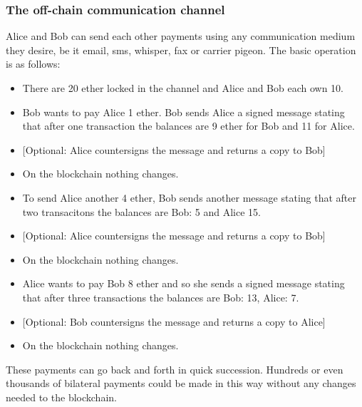 \subsubsection*{The off-chain communication channel}
Alice and Bob can send each other payments using any communication medium they desire, be it email, sms, whisper, fax or carrier pigeon. The basic operation is as follows: 
\begin{itemize}
 \item There are 20 ether locked in the channel and Alice and Bob each own 10.
 \item Bob wants to pay Alice 1 ether. Bob sends Alice a signed message stating that after one transaction the balances are 9 ether for Bob and 11 for Alice.
 \item {[}Optional: Alice countersigns the message and returns a copy to Bob]
 \item On the blockchain nothing changes.
 \item To send Alice another 4 ether, Bob sends another message stating that after two transacitons the balances are Bob: 5 and Alice 15.
 \item {[}Optional: Alice countersigns the message and returns a copy to Bob]
 \item On the blockchain nothing changes.
 \item Alice wants to pay Bob 8 ether and so she sends a signed message stating that after three transactions the balances are Bob: 13, Alice: 7.
 \item {[}Optional: Bob countersigns the message and returns a copy to Alice]
 \item On the blockchain nothing changes.
\end{itemize}
These payments can go back and forth in quick succession. Hundreds or even thousands of bilateral payments could be made in this way without any changes needed to the blockchain. 
